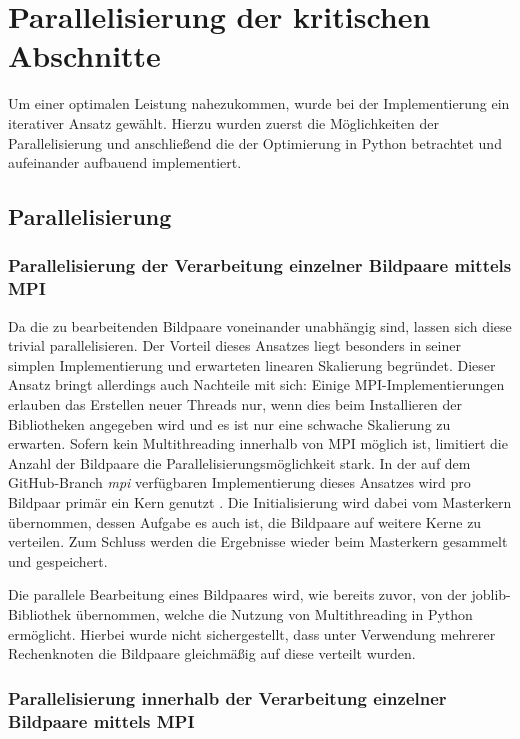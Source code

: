 \chapter{Parallelisierung der kritischen Abschnitte}

Um einer optimalen Leistung nahezukommen, wurde bei der Implementierung ein iterativer Ansatz gewählt. Hierzu wurden zuerst die Möglichkeiten der Parallelisierung und anschließend die der Optimierung in Python betrachtet und aufeinander aufbauend implementiert. 

\section{Parallelisierung}

\subsection{Parallelisierung der Verarbeitung einzelner Bildpaare mittels MPI}

Da die zu bearbeitenden Bildpaare voneinander unabhängig sind, lassen sich diese trivial parallelisieren. Der Vorteil dieses Ansatzes liegt besonders in seiner simplen Implementierung und erwarteten linearen Skalierung begründet. Dieser Ansatz bringt allerdings auch Nachteile mit sich: Einige \gls{MPI}-Implementierungen erlauben das Erstellen neuer Threads nur, wenn dies beim Installieren der Bibliotheken angegeben wird \cite{OMPI17} und es ist nur eine schwache Skalierung zu erwarten. Sofern kein Multithreading innerhalb von \gls{MPI} möglich ist, limitiert die Anzahl der Bildpaare die Parallelisierungsmöglichkeit stark. In der auf dem GitHub-Branch \textit{mpi} verfügbaren Implementierung dieses Ansatzes wird pro Bildpaar  primär ein Kern genutzt \cite{CBS18}. Die Initialisierung wird dabei vom Masterkern übernommen, dessen Aufgabe es auch ist, die Bildpaare auf weitere Kerne zu verteilen. Zum Schluss werden die Ergebnisse wieder beim Masterkern gesammelt und gespeichert.

Die parallele Bearbeitung eines Bildpaares wird, wie bereits zuvor, von der joblib-Bibliothek übernommen, welche die Nutzung von Multithreading in Python ermöglicht. Hierbei wurde nicht sichergestellt, dass unter Verwendung mehrerer Rechenknoten die Bildpaare gleichmäßig auf diese verteilt wurden. 

\subsection{Parallelisierung innerhalb der Verarbeitung einzelner Bildpaare mittels MPI}

